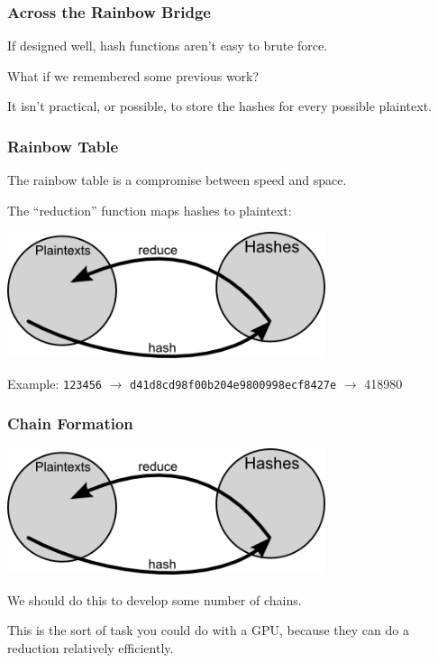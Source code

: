 \begin{frame}
\frametitle{Across the Rainbow Bridge}

If designed well, hash functions aren't easy to brute force.

What if we remembered some previous work? 

It isn't practical, or possible, to store the hashes for every possible plaintext.

\end{frame}


\begin{frame}
\frametitle{Rainbow Table}

The rainbow table is a compromise between speed and space. 

The ``reduction'' function maps hashes to plaintext:

\begin{center}
	\includegraphics[width=0.7\textwidth]{images/rainbow-tables-reduce.png}
\end{center}

Example: \texttt{123456} $\rightarrow$ \texttt{d41d8cd98f00b204e9800998ecf8427e} $\rightarrow$ 418980

\end{frame}


\begin{frame}
\frametitle{Chain Formation}

\begin{center}
	\includegraphics[width=0.7\textwidth]{images/rainbow-tables-reduce.png}
\end{center}

We should do this to develop some number of chains. 

This is the sort of task you could do with a GPU, because they can do a reduction relatively efficiently. 

\end{frame}


